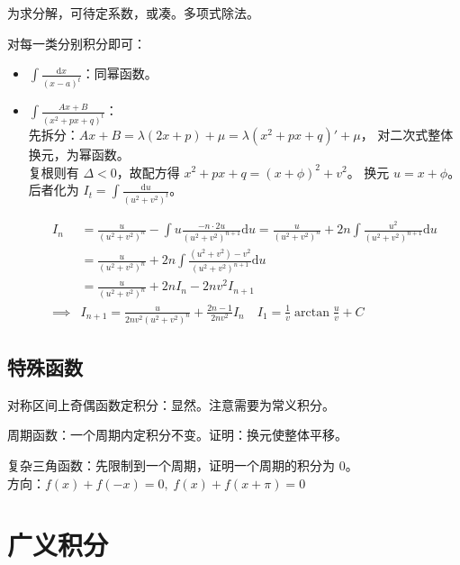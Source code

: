\documentclass[12pt, a4paper, UTF8, openany]{ctexbook}
\newcommand{\dif}{\mathrm{d}}
\begin{document}
        为求分解，可待定系数，或凑。多项式除法。

        对每一类分别积分即可：
        \begin{itemize}
            \item $\int \frac{\dif x}{(x - a)^t}$：同幂函数。
            \item $\int \frac{Ax + B}{(x^2 + px + q)^t}$：\\
                先拆分：$Ax + B = \lambda(2x + p) + \mu = \lambda(x^2 + px + q)' + \mu$，
                对二次式整体换元，为幂函数。\\
                复根则有 $\Delta < 0$，故配方得 $x^2 + px + q = (x + \phi)^2 + v^2$。
                换元 $u = x + \phi$。\\
                后者化为 $I_t = \int\frac{\dif u}{(u^2 + v^2)^t}$。

                $$\begin{aligned}
                    I_n &= \frac{u}{(u^2 + v^2)^n} - \int u \frac{-n \cdot 2u}{(u^2 + v^2)^{n + 1}}\dif u
                        = \frac{u}{(u^2 + v^2)^n} + 2n\int \frac{u^2}{(u^2 + v^2)^{n + 1}}\dif u\\
                        &= \frac{u}{(u^2 + v^2)^n} + 2n\int \frac{(u^2 + v^2) - v^2}{(u^2 + v^2)^{n + 1}}\dif u\\
                        &= \frac{u}{(u^2 + v^2)^n} + 2nI_n - 2nv^2I_{n + 1}\\
                    \implies &I_{n + 1} = \frac{u}{2nv^2(u^2 + v^2)^n} + \frac{2n - 1}{2nv^2}I_n 
                    \quad I_1 = \frac{1}{v}\arctan\frac{u}{v} + C
                \end{aligned}$$
        \end{itemize}

        \subsection{特殊函数}
        对称区间上奇偶函数定积分：显然。注意需要为{\heiti 常义积分}。

        周期函数：一个周期内定积分不变。证明：换元使整体平移。

        复杂三角函数：先限制到一个周期，证明一个周期的积分为 0。\\
        方向：$f(x) + f(-x) = 0, \; f(x) + f(x + \pi) = 0$

    \section{广义积分}
\end{document}
